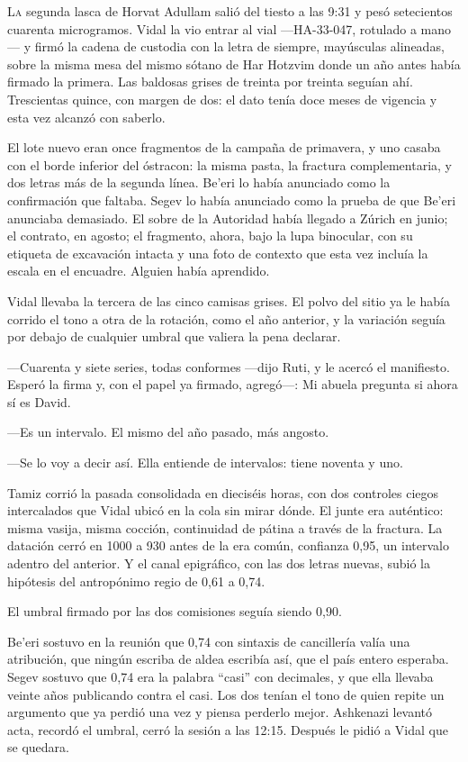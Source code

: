 \lettrine[lines=2, lhang=0.1, nindent=0.2em]{L}{a} segunda lasca de Horvat Adullam salió del tiesto a las 9:31 y pesó setecientos cuarenta microgramos. Vidal la vio entrar al vial ---HA-33-047, rotulado a mano--- y firmó la cadena de custodia con la letra de siempre, mayúsculas alineadas, sobre la misma mesa del mismo sótano de Har Hotzvim donde un año antes había firmado la primera. Las baldosas grises de treinta por treinta seguían ahí. Trescientas quince, con margen de dos: el dato tenía doce meses de vigencia y esta vez alcanzó con saberlo.


El lote nuevo eran once fragmentos de la campaña de primavera, y uno casaba con el borde inferior del óstracon: la misma pasta, la fractura complementaria, y dos letras más de la segunda línea. Be'eri lo había anunciado como la confirmación que faltaba. Segev lo había anunciado como la prueba de que Be'eri anunciaba demasiado. El sobre de la Autoridad había llegado a Zúrich en junio; el contrato, en agosto; el fragmento, ahora, bajo la lupa binocular, con su etiqueta de excavación intacta y una foto de contexto que esta vez incluía la escala en el encuadre. Alguien había aprendido.

Vidal llevaba la tercera de las cinco camisas grises. El polvo del sitio ya le había corrido el tono a otra de la rotación, como el año anterior, y la variación seguía por debajo de cualquier umbral que valiera la pena declarar.

---Cuarenta y siete series, todas conformes ---dijo Ruti, y le acercó el manifiesto. Esperó la firma y, con el papel ya firmado, agregó---: Mi abuela pregunta si ahora sí es David.

---Es un intervalo. El mismo del año pasado, más angosto.

---Se lo voy a decir así. Ella entiende de intervalos: tiene noventa y uno.

Tamiz corrió la pasada consolidada en dieciséis horas, con dos controles ciegos intercalados que Vidal ubicó en la cola sin mirar dónde. El junte era auténtico: misma vasija, misma cocción, continuidad de pátina a través de la fractura. La datación cerró en 1000 a 930 antes de la era común, confianza 0,95, un intervalo adentro del anterior. Y el canal epigráfico, con las dos letras nuevas, subió la hipótesis del antropónimo regio de 0,61 a 0,74.

El umbral firmado por las dos comisiones seguía siendo 0,90.

Be'eri sostuvo en la reunión que 0,74 con sintaxis de cancillería valía una atribución, que ningún escriba de aldea escribía así, que el país entero esperaba. Segev sostuvo que 0,74 era la palabra ``casi'' con decimales, y que ella llevaba veinte años publicando contra el casi. Los dos tenían el tono de quien repite un argumento que ya perdió una vez y piensa perderlo mejor. Ashkenazi levantó acta, recordó el umbral, cerró la sesión a las 12:15. Después le pidió a Vidal que se quedara.

